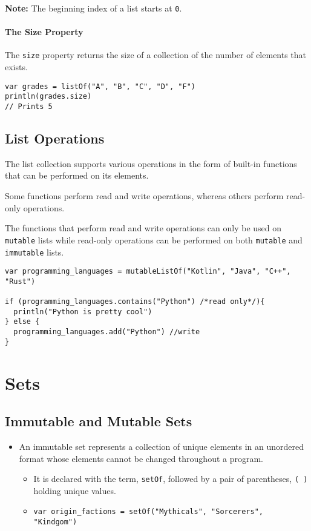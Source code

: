 \textbf{Note: }The beginning index of a list starts at \verb!0!.

\paragraph{The Size Property}
The \verb!size! property returns the size of a collection of the number of elements that exists.

\begin{verbatim}
var grades = listOf("A", "B", "C", "D", "F")
println(grades.size)
// Prints 5
\end{verbatim}
\newpage
\subsection{List Operations}
The list collection supports various operations in the form of built-in functions that can be performed on its elements.

Some functions perform read and write operations, whereas others perform read-only operations.

The functions that perform read and write operations can only be used on \verb!mutable! lists while read-only operations can be
performed on both \verb!mutable! and \verb!immutable! lists.

\begin{verbatim}
var programming_languages = mutableListOf("Kotlin", "Java", "C++", "Rust")

if (programming_languages.contains("Python") /*read only*/){
  println("Python is pretty cool")
} else {
  programming_languages.add("Python") //write 
}
\end{verbatim}

\section{Sets}
\subsection{Immutable and Mutable Sets}
\begin{itemize}
    \item An immutable set represents a collection of unique elements in an unordered format whose elements cannot be changed throughout a program.
          \begin{itemize}
              \item It is declared with the term, \verb!setOf!, followed by a pair of parentheses,
                    \verb!( )! holding unique values.
              \item \verb!var origin_factions = setOf("Mythicals", "Sorcerers", "Kindgom")!
          \end{itemize}
\end{itemize}

